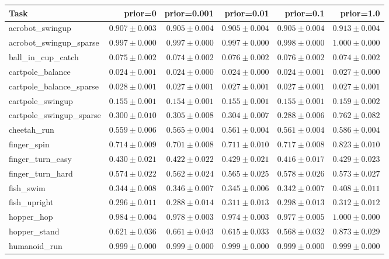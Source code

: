\begin{tabular}{lrrrrr}
  \toprule
  Task & prior=0 & prior=0.001 & prior=0.01 & prior=0.1 & prior=1.0 \\
  \midrule
  acrobot\_swingup & $0.907\pm0.003$ & $0.905\pm0.004$ & $0.905\pm0.004$ & $0.905\pm0.004$ & $0.913\pm0.004$ \\
  acrobot\_swingup\_sparse & $0.997\pm0.000$ & $0.997\pm0.000$ & $\mathbf{0.997\pm0.000}$ & $0.998\pm0.000$ & $1.000\pm0.000$ \\
  ball\_in\_cup\_catch & $0.075\pm0.002$ & $0.074\pm0.002$ & $0.076\pm0.002$ & $0.076\pm0.002$ & $0.074\pm0.002$ \\
  cartpole\_balance & $0.024\pm0.001$ & $0.024\pm0.000$ & $0.024\pm0.000$ & $0.024\pm0.001$ & $0.027\pm0.000$ \\
  cartpole\_balance\_sparse & $0.028\pm0.001$ & $0.027\pm0.001$ & $\mathbf{0.027\pm0.001}$ & $0.027\pm0.001$ & $0.027\pm0.001$ \\
  cartpole\_swingup & $0.155\pm0.001$ & $0.154\pm0.001$ & $0.155\pm0.001$ & $0.155\pm0.001$ & $0.159\pm0.002$ \\
  cartpole\_swingup\_sparse & $0.300\pm0.010$ & $0.305\pm0.008$ & $0.304\pm0.007$ & $0.288\pm0.006$ & $0.762\pm0.082$ \\
  cheetah\_run & $0.559\pm0.006$ & $0.565\pm0.004$ & $0.561\pm0.004$ & $0.561\pm0.004$ & $0.586\pm0.004$ \\
  finger\_spin & $0.714\pm0.009$ & $\mathbf{0.701\pm0.008}$ & $0.711\pm0.010$ & $0.717\pm0.008$ & $0.823\pm0.010$ \\
  finger\_turn\_easy & $0.430\pm0.021$ & $0.422\pm0.022$ & $0.429\pm0.021$ & $0.416\pm0.017$ & $0.429\pm0.023$ \\
  finger\_turn\_hard & $0.574\pm0.022$ & $0.562\pm0.024$ & $0.565\pm0.025$ & $0.578\pm0.026$ & $0.573\pm0.027$ \\
  fish\_swim & $0.344\pm0.008$ & $0.346\pm0.007$ & $0.345\pm0.006$ & $0.342\pm0.007$ & $0.408\pm0.011$ \\
  fish\_upright & $0.296\pm0.011$ & $0.288\pm0.014$ & $0.311\pm0.013$ & $0.298\pm0.013$ & $0.312\pm0.012$ \\
  hopper\_hop & $0.984\pm0.004$ & $\mathbf{0.978\pm0.003}$ & $\mathbf{0.974\pm0.003}$ & $0.977\pm0.005$ & $1.000\pm0.000$ \\
  hopper\_stand & $0.621\pm0.036$ & $0.661\pm0.043$ & $0.615\pm0.033$ & $0.568\pm0.032$ & $0.873\pm0.029$ \\
  humanoid\_run & $0.999\pm0.000$ & $\mathbf{0.999\pm0.000}$ & $0.999\pm0.000$ & $0.999\pm0.000$ & $0.999\pm0.000$ \\

\end{tabular}
